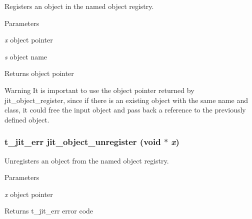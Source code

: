 Registers an object in the named object registry. 
\begin{DoxyParams}{Parameters}
\item[{\em x}]object pointer \item[{\em s}]object name\end{DoxyParams}
\begin{DoxyReturn}{Returns}
object pointer
\end{DoxyReturn}
\begin{DoxyWarning}{Warning}
It is important to use the object pointer returned by jit\_\-object\_\-register, since if there is an existing object with the same name and class, it could free the input object and pass back a reference to the previously defined object. 
\end{DoxyWarning}
\hypertarget{group__objectmod_ga21f77a08c1a98aaf68e4b2913487be0f}{
\subsubsection[{jit\_\-object\_\-unregister}]{\setlength{\rightskip}{0pt plus 5cm}t\_\-jit\_\-err jit\_\-object\_\-unregister (void $\ast$ {\em x})}}
\label{group__objectmod_ga21f77a08c1a98aaf68e4b2913487be0f}


Unregisters an object from the named object registry. 
\begin{DoxyParams}{Parameters}
\item[{\em x}]object pointer\end{DoxyParams}
\begin{DoxyReturn}{Returns}
t\_\-jit\_\-err error code 
\end{DoxyReturn}
